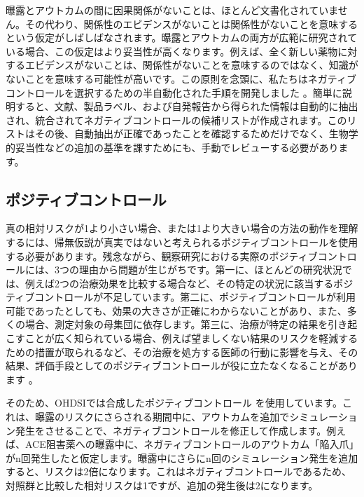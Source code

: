 \documentclass[
  11pt]{book}
\theoremstyle{definition}
\theoremstyle{definition}
\theoremstyle{definition}
\theoremstyle{definition}
\theoremstyle{remark}
\begin{document}
曝露とアウトカムの間に因果関係がないことは、ほとんど文書化されていません。その代わり、関係性のエビデンスがないことは関係性がないことを意味するという仮定がしばしばなされます。曝露とアウトカムの両方が広範に研究されている場合、この仮定はより妥当性が高くなります。例えば、全く新しい薬物に対するエビデンスがないことは、関係性がないことを意味するのではなく、知識がないことを意味する可能性が高いです。この原則を念頭に、私たちはネガティブコントロールを選択するための半自動化された手順を開発しました \citep{voss_2016}。簡単に説明すると、文献、製品ラベル、および自発報告から得られた情報は自動的に抽出され、統合されてネガティブコントロールの候補リストが作成されます。このリストはその後、自動抽出が正確であったことを確認するためだけでなく、生物学的妥当性などの追加の基準を課すためにも、手動でレビューする必要があります。

\subsection{ポジティブコントロール}\label{PositiveControls}


真の相対リスクが1より小さい場合、または1より大きい場合の方法の動作を理解するには、帰無仮説が真実ではないと考えられるポジティブコントロールを使用する必要があります。残念ながら、観察研究における実際のポジティブコントロールには、3つの理由から問題が生じがちです。第一に、ほとんどの研究状況では、例えば2つの治療効果を比較する場合など、その特定の状況に該当するポジティブコントロールが不足しています。第二に、ポジティブコントロールが利用可能であったとしても、効果の大きさが正確にわからないことがあり、また、多くの場合、測定対象の母集団に依存します。第三に、治療が特定の結果を引き起こすことが広く知られている場合、例えば望ましくない結果のリスクを軽減するための措置が取られるなど、その治療を処方する医師の行動に影響を与え、その結果、評価手段としてのポジティブコントロールが役に立たなくなることがあります \citep{noren_2014}。

そのため、OHDSIでは合成したポジティブコントロール \citep{schuemie_2018} を使用しています。これは、曝露のリスクにさらされる期間中に、アウトカムを追加でシミュレーション発生をさせることで、ネガティブコントロールを修正して作成します。例えば、ACE阻害薬への曝露中に、ネガティブコントロールのアウトカム「陥入爪」がn回発生したと仮定します。曝露中にさらにn回のシミュレーション発生を追加すると、リスクは2倍になります。これはネガティブコントロールであるため、対照群と比較した相対リスクは1ですが、追加の発生後は2になります。
\end{document}
